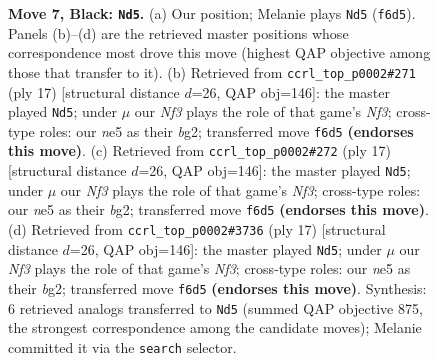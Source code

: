 \documentclass[11pt]{article}
\begin{document}
\begin{figure}[p]
\caption{\textbf{Move 7, Black: \texttt{Nd5}.} (a) Our position; Melanie plays \texttt{Nd5} (\texttt{f6d5}). Panels (b)--(d) are the retrieved master positions whose correspondence most drove this move (highest QAP objective among those that transfer to it). (b) Retrieved from \texttt{ccrl\_top\_p0002\#271} (ply 17) [structural distance $d$=26, QAP obj=146]: the master played \texttt{Nd5}; under $\mu$ our \emph{Nf3} plays the role of that game's \emph{Nf3}; cross-type roles: our \emph{n}e5 as their \emph{b}g2; transferred move \texttt{f6d5} \textbf{(endorses this move)}. (c) Retrieved from \texttt{ccrl\_top\_p0002\#272} (ply 17) [structural distance $d$=26, QAP obj=146]: the master played \texttt{Nd5}; under $\mu$ our \emph{Nf3} plays the role of that game's \emph{Nf3}; cross-type roles: our \emph{n}e5 as their \emph{b}g2; transferred move \texttt{f6d5} \textbf{(endorses this move)}. (d) Retrieved from \texttt{ccrl\_top\_p0002\#3736} (ply 17) [structural distance $d$=26, QAP obj=146]: the master played \texttt{Nd5}; under $\mu$ our \emph{Nf3} plays the role of that game's \emph{Nf3}; cross-type roles: our \emph{n}e5 as their \emph{b}g2; transferred move \texttt{f6d5} \textbf{(endorses this move)}. Synthesis: 6 retrieved analogs transferred to \texttt{Nd5} (summed QAP objective 875, the strongest correspondence among the candidate moves); Melanie committed it via the \texttt{search} selector.}
\label{fig:thought-m13}
\end{figure}

\clearpage
\end{document}
